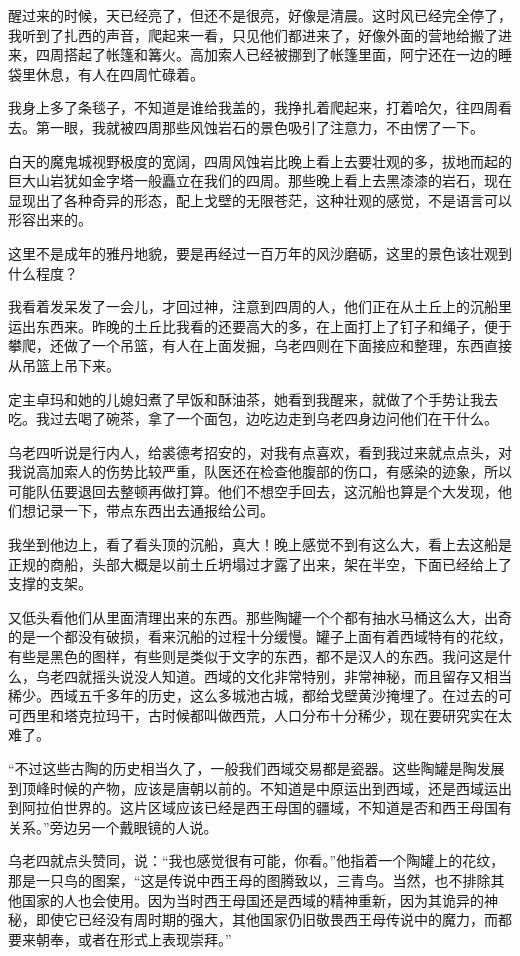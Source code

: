 醒过来的时候，天已经亮了，但还不是很亮，好像是清晨。这时风已经完全停了，我听到了扎西的声音，爬起来一看，只见他们都进来了，好像外面的营地给搬了进来，四周搭起了帐篷和篝火。高加索人已经被挪到了帐篷里面，阿宁还在一边的睡袋里休息，有人在四周忙碌着。

我身上多了条毯子，不知道是谁给我盖的，我挣扎着爬起来，打着哈欠，往四周看去。第一眼，我就被四周那些风蚀岩石的景色吸引了注意力，不由愣了一下。

白天的魔鬼城视野极度的宽阔，四周风蚀岩比晚上看上去要壮观的多，拔地而起的巨大山岩犹如金字塔一般矗立在我们的四周。那些晚上看上去黑漆漆的岩石，现在显现出了各种奇异的形态，配上戈壁的无限苍茫，这种壮观的感觉，不是语言可以形容出来的。

这里不是成年的雅丹地貌，要是再经过一百万年的风沙磨砺，这里的景色该壮观到什么程度？

我看着发呆发了一会儿，才回过神，注意到四周的人，他们正在从土丘上的沉船里运出东西来。昨晚的土丘比我看的还要高大的多，在上面打上了钉子和绳子，便于攀爬，还做了一个吊篮，有人在上面发掘，乌老四则在下面接应和整理，东西直接从吊篮上吊下来。

定主卓玛和她的儿媳妇煮了早饭和酥油茶，她看到我醒来，就做了个手势让我去吃。我过去喝了碗茶，拿了一个面包，边吃边走到乌老四身边问他们在干什么。

乌老四听说是行内人，给裘德考招安的，对我有点喜欢，看到我过来就点点头，对我说高加索人的伤势比较严重，队医还在检查他腹部的伤口，有感染的迹象，所以可能队伍要退回去整顿再做打算。他们不想空手回去，这沉船也算是个大发现，他们想记录一下，带点东西出去通报给公司。

我坐到他边上，看了看头顶的沉船，真大！晚上感觉不到有这么大，看上去这船是正规的商船，头部大概是以前土丘坍塌过才露了出来，架在半空，下面已经给上了支撑的支架。

又低头看他们从里面清理出来的东西。那些陶罐一个个都有抽水马桶这么大，出奇的是一个都没有破损，看来沉船的过程十分缓慢。罐子上面有着西域特有的花纹，有些是黑色的图样，有些则是类似于文字的东西，都不是汉人的东西。我问这是什么，乌老四就摇头说没人知道。西域的文化非常特别，非常神秘，而且留存又相当稀少。西域五千多年的历史，这么多城池古城，都给戈壁黄沙掩埋了。在过去的可可西里和塔克拉玛干，古时候都叫做西荒，人口分布十分稀少，现在要研究实在太难了。

“不过这些古陶的历史相当久了，一般我们西域交易都是瓷器。这些陶罐是陶发展到顶峰时候的产物，应该是唐朝以前的。不知道是中原运出到西域，还是西域运出到阿拉伯世界的。这片区域应该已经是西王母国的疆域，不知道是否和西王母国有关系。”旁边另一个戴眼镜的人说。

乌老四就点头赞同，说：“我也感觉很有可能，你看。”他指着一个陶罐上的花纹，那是一只鸟的图案，“这是传说中西王母的图腾致以，三青鸟。当然，也不排除其他国家的人也会使用。因为当时西王母国还是西域的精神重新，因为其诡异的神秘，即使它已经没有周时期的强大，其他国家仍旧敬畏西王母传说中的魔力，而都要来朝奉，或者在形式上表现崇拜。”

